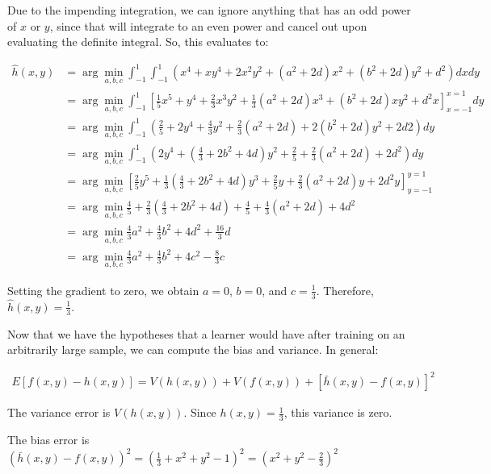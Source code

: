 \documentclass[fleqn]{homework}
\begin{document}
\begin{problem}{3}
\begin{enumerate}[(a)]
      Due to the impending integration, we can ignore anything that has an odd
      power of $x$ or $y$, since that will integrate to an even power and cancel
      out upon evaluating the definite integral.  So, this evaluates to:

      \begin{align*}
        \hat{h}(x,y) &= \arg \min_{a,b,c} \int_{-1}^1\int_{-1}^1 \left(x^4 + xy^4 + 2x^2y^2 + (a^2 + 2d)x^2 + (b^2 + 2d) y^2 + d^2 \right)dx dy \\
        &= \arg \min_{a,b,c} \int_{-1}^1 \left[\frac{1}{5}x^5 + y^4 + \frac{2}{3}x^3y^2 + \frac{1}{3}(a^2 + 2d)x^3 + (b^2 + 2d) xy^2 + d^2x \right]_{x=-1}^{x=1}dy \\
        &= \arg \min_{a,b,c} \int_{-1}^1 \left(\frac{2}{5} + 2y^4 + \frac{4}{3}y^2 + \frac{2}{3}(a^2+2d) + 2(b^2 + 2d)y^2 + 2d2\right)dy \\
        &= \arg \min_{a,b,c} \int_{-1}^1 \left( 2y^4 + \left(\frac{4}{3} + 2b^2 + 4d\right)y^2 + \frac{2}{5}+\frac{2}{3}(a^2+2d) + 2d^2\right)dy \\
        &= \arg \min_{a,b,c} \left[ \frac{2}{5}y^5 + \frac{1}{3}\left(\frac{4}{3} + 2b^2 + 4d\right)y^3 + \frac{2}{5}y+\frac{2}{3}(a^2+2d)y + 2d^2y\right]_{y=-1}^{y=1} \\
        &= \arg \min_{a,b,c} \frac{4}{5} + \frac{2}{3}\left(\frac{4}{3} + 2b^2 + 4d\right) + \frac{4}{5}+\frac{4}{3}(a^2+2d) + 4d^2 \\
        &= \arg \min_{a,b,c} \frac{4}{3}a^2 + \frac{4}{3}b^2 + 4d^2 + \frac{16}{3}d \\
        &= \arg \min_{a,b,c} \frac{4}{3}a^2 + \frac{4}{3}b^2 + 4c^2 - \frac{8}{3}c
      \end{align*}

      Setting the gradient to zero, we obtain $a=0$, $b=0$, and $c=\frac{1}{3}$.
      Therefore, $\hat{h}(x,y) = \frac{1}{3}$.

      Now that we have the hypotheses that a learner would have after training
      on an arbitrarily large sample, we can compute the bias and variance.  In
      general:

      \begin{align*}
        E[f(x,y) - h(x,y)] = V(h(x,y)) + V(f(x,y)) + [\bar{h}(x,y) - f(x,y)]^2
      \end{align*}

      The variance error is $V(h(x,y))$.  Since $h(x,y) = \frac{1}{3}$, this
      variance is zero.

      The bias error is
      $(\bar{h}(x,y) - f(x,y))^2 = (\frac{1}{3} + x^2 + y^2 - 1)^2 = (x^2 + y^2
      - \frac{2}{3})^2$
    \end{enumerate}
  \end{problem}
\end{document}
